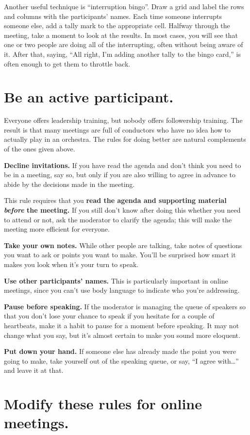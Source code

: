 \documentclass[10pt,letterpaper]{article}
\newcommand{\rulemajor}[1]{\section{#1}}
\begin{document}
Another useful technique is ``interruption bingo''. Draw a grid and label the
rows and columns with the participants' names. Each time someone interrupts
someone else, add a tally mark to the appropriate cell. Halfway through the
meeting, take a moment to look at the results.  In most cases, you will see that
one or two people are doing all of the interrupting, often without being aware
of it. After that, saying, ``All right, I'm adding another tally to the bingo
card,'' is often enough to get them to throttle back.

\rulemajor{Be an active participant.}

Everyone offers leadership training, but nobody offers followership training.
The result is that many meetings are full of conductors who have no idea how to
actually play in an orchestra.  The rules for doing better are natural
complements of the ones given above.

\textbf{Decline invitations.} If you have read the agenda and don't think you
need to be in a meeting, say so, but only if you are also willing to agree in
advance to abide by the decisions made in the meeting.

This rule requires that you \textbf{read the agenda and supporting material
\emph{before} the meeting.}  If you still don't know after doing this whether
you need to attend or not, ask the moderator to clarify the agenda; this will
make the meeting more efficient for everyone.

\textbf{Take your own notes.}  While other people are talking, take notes of
questions you want to ask or points you want to make.  You'll be surprised how
smart it makes you look when it's your turn to speak.

\textbf{Use other participants' names.}  This is particularly important in
online meetings, since you can't use body language to indicate who you're
addressing.

\textbf{Pause before speaking.} If the moderator is managing the queue of
speakers so that you don't lose your chance to speak if you hesitate for a
couple of heartbeats, make it a habit to pause for a moment before speaking.  It
may not change what you say, but it's almost certain to make you sound more
eloquent.

\textbf{Put down your hand.} If someone else has already made the point you were
going to make, take yourself out of the speaking queue, or say, ``I agree
with{\ldots}'' and leave it at that.

\rulemajor{Modify these rules for online meetings.}
\end{document}
